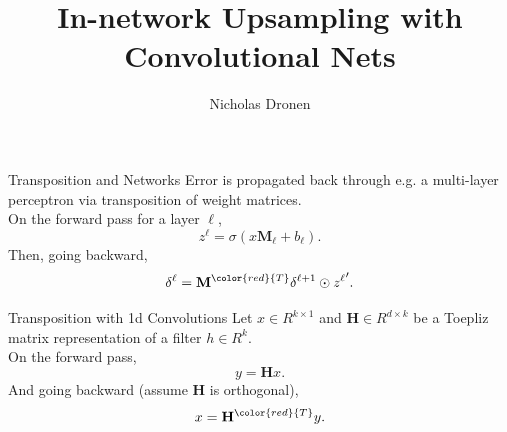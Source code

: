 \documentclass[]{beamer}
\begin{document}

\title{In-network Upsampling with Convolutional Nets}
\author{Nicholas Dronen}


\begin{frame}
\maketitle
\end{frame}


\begin{frame}{Transposition and Networks}
Error is propagated back through e.g. a multi-layer perceptron via transposition of weight matrices. \\
\vspace{2mm}
\centering
On the forward pass for a layer $\ell$,
\begin{equation*}
z^{\ell} = \sigma(x\mathbf{M}_{\ell} + b_{\ell}).
\end{equation*}
Then, going backward, 
\centering
\begin{equation*}
\delta^{\ell} = \mathbf{M}^{\color{red}{T}} \delta^{\ell+1} \odot {z^{\ell}}^{\prime}.
\end{equation*}
\end{frame}


\begin{frame}{Transposition with 1d Convolutions}
Let $x \in R^{k \times 1}$ and $\mathbf{H} \in R^{d \times k}$ be a Toepliz matrix representation of a filter $h \in R^{k}$. \\
\vspace{2mm}
\centering
On the forward pass,
\begin{equation*}
y = \mathbf{H} x.
\end{equation*}
And going backward (assume $\mathbf{H}$ is orthogonal),
\begin{equation*}
x = \mathbf{H}^{\color{red}{T}} y.
\end{equation*}
\end{frame}
\end{document}

